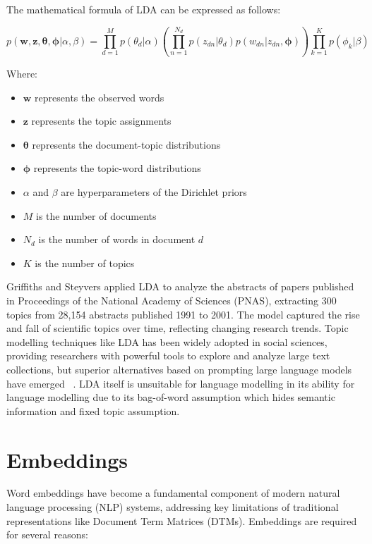 \documentclass[a4paper, oneside]{discothesis}
\begin{document}
The mathematical formula of LDA can be expressed as follows:

\begin{equation}
p(\mathbf{w}, \mathbf{z}, \boldsymbol{\theta}, \boldsymbol{\phi} | \alpha, \beta) = 
\prod_{d=1}^M p(\theta_d | \alpha) 
\left( \prod_{n=1}^{N_d} p(z_{dn} | \theta_d) p(w_{dn} | z_{dn}, \boldsymbol{\phi}) \right)
\prod_{k=1}^K p(\phi_k | \beta)
\end{equation}

Where:
\begin{itemize}
    \item $\mathbf{w}$ represents the observed words
    \item $\mathbf{z}$ represents the topic assignments
    \item $\boldsymbol{\theta}$ represents the document-topic distributions
    \item $\boldsymbol{\phi}$ represents the topic-word distributions
    \item $\alpha$ and $\beta$ are hyperparameters of the Dirichlet priors
    \item $M$ is the number of documents
    \item $N_d$ is the number of words in document $d$
    \item $K$ is the number of topics
\end{itemize}

Griffiths and Steyvers \cite{griffiths2004finding} applied LDA to analyze the abstracts of papers published in Proceedings of the National Academy of Sciences (PNAS), 
extracting 300 topics from 28,154 abstracts published 1991 to 2001. The model captured the rise and fall of scientific topics over time, reflecting changing research trends.
Topic modelling techniques like LDA has been widely adopted in social sciences, providing researchers with powerful tools to explore and analyze large text collections, 
but superior alternatives based on prompting large language models have emerged ~\cite{WangPrakashPromptTopic}. LDA itself is unsuitable for language modelling  in its
ability for language modelling due to its bag-of-word assumption which hides semantic information and fixed topic assumption.  

\section{Embeddings}
Word embeddings have become a fundamental component of modern natural language processing (NLP) systems, addressing key limitations of traditional representations like Document Term Matrices (DTMs). 
Embeddings are required for several reasons:
\end{document}
